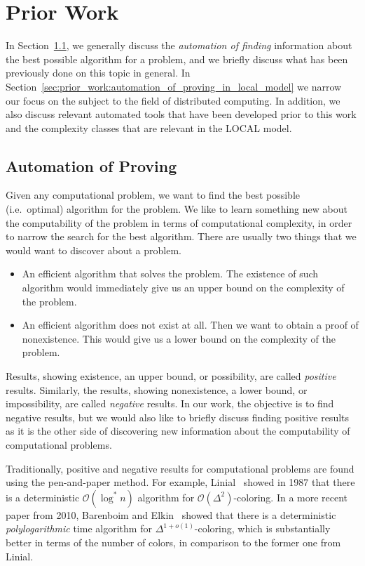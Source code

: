 
\section{Prior Work} \label{sec:prior_work}
In Section~\ref{sec:prior_work:automation_of_proving}, we generally discuss the \emph{automation of finding} information about the best possible algorithm for a problem, and we briefly discuss what has been previously done on this topic in general.
In Section~\ref{sec:prior_work:automation_of_proving_in_local_model} we narrow our focus on the subject to the field of distributed computing.
In addition, we also discuss relevant automated tools that have been developed prior to this work and the complexity classes that are relevant in the LOCAL model.

\subsection{Automation of Proving} \label{sec:prior_work:automation_of_proving}
Given any computational problem, we want to find the best possible (i.e.\ optimal) algorithm for the problem.
We like to learn something new about the computability of the problem in terms of computational complexity, in order to narrow the search for the best algorithm.
There are usually two things that we would want to discover about a problem.
\begin{itemize}
    \item
    An efficient algorithm that solves the problem.
    The existence of such algorithm would immediately give us an upper bound on the complexity of the problem.
    \item
    An efficient algorithm does not exist at all.
    Then we want to obtain a proof of nonexistence.
    This would give us a lower bound on the complexity of the problem.
\end{itemize}
Results, showing existence, an upper bound, or possibility, are called \emph{positive} results.
Similarly, the results, showing nonexistence, a lower bound, or impossibility, are called \emph{negative} results.
In our work, the objective is to find negative results, but we would also like to briefly discuss finding positive results as it is the other side of discovering new information about the computability of computational problems.

Traditionally, positive and negative results for computational problems are found using the pen-and-paper method.
For example, Linial\ \cite{DBLP:conf/focs/Linial87} showed in 1987 that there is a deterministic \(\mathcal{O}(\log^* n)\) algorithm for \(\mathcal{O}(\Delta^2)\)-coloring.
In a more recent paper from 2010, Barenboim and Elkin\ \cite{DBLP:conf/podc/BarenboimE10} showed that there is a deterministic \emph{polylogarithmic} time algorithm for \(\Delta^{1 + o(1)}\)-coloring, which is substantially better in terms of the number of colors, in comparison to the former one \cite{DBLP:conf/focs/Linial87} from Linial.

